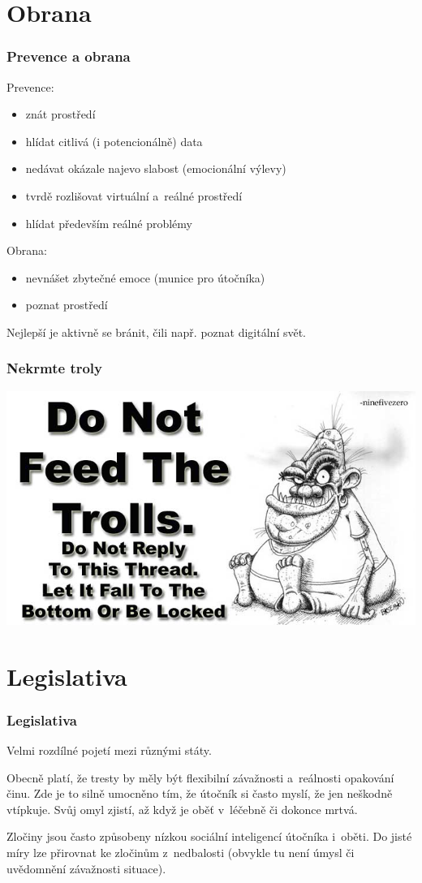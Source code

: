 \documentclass[xetex]{beamer}
\begin{document}
\section{Obrana}
\begin{frame}
	\frametitle{Prevence a obrana}

Prevence:
	\begin{itemize}
		\item znát prostředí
		\item hlídat citlivá (i potencionálně) data
		\item nedávat okázale najevo slabost (emocionální výlevy)
		\item tvrdě rozlišovat virtuální a~reálné prostředí
		\item hlídat především reálné problémy
	\end{itemize}	

Obrana:
	\begin{itemize}
		\item nevnášet zbytečné emoce (munice pro útočníka)
		\item poznat prostředí
	\end{itemize}

	Nejlepší je aktivně se bránit, čili např. poznat digitální svět.
\end{frame}

\begin{frame}
	\frametitle{Nekrmte troly}
	\includegraphics[scale=0.45]{feed.the.troll.png}
\end{frame}


\section{Legislativa}
\begin{frame}
	\frametitle{Legislativa}

	Velmi rozdílné pojetí mezi různými státy.

	\bigskip

	Obecně platí, že tresty by měly být flexibilní závažnosti a~reálnosti opakování činu. 
	Zde je to silně umocněno tím, že útočník si často myslí, že jen neškodně vtípkuje. 
	Svůj omyl zjistí, až když je oběť v~léčebně či dokonce mrtvá.

	\bigskip

	Zločiny jsou často způsobeny nízkou sociální inteligencí útočníka i~oběti.
	Do jisté míry lze přirovnat ke zločinům z~nedbalosti 
	(obvykle tu není úmysl či uvědomnění závažnosti situace).
\end{frame}
\end{document}
